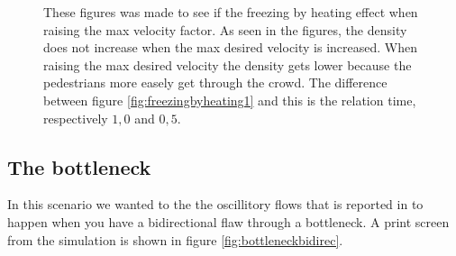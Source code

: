 \begin{figure}[h]
\centering
{}
\caption{These figures was made to see if the freezing by heating effect when raising the max velocity factor. As seen in the figures, the
density does not increase when the max desired velocity is increased. When raising the max desired velocity the density gets lower because
the pedestrians more easely get through the crowd. The difference between figure \ref{fig:freezingbyheating1} and this is the relation time,
respectively $1,0$ and $0,5$.}
\label{fig:freezingbyheating05}
\end{figure}

\subsection{The bottleneck}
In this scenario we wanted to the the oscillitory flows that is reported 
in \cite{self-org} to happen when you have a bidirectional flaw through a 
bottleneck. A print screen from the simulation is shown in figure 
\ref{fig:bottleneckbidirec}.

